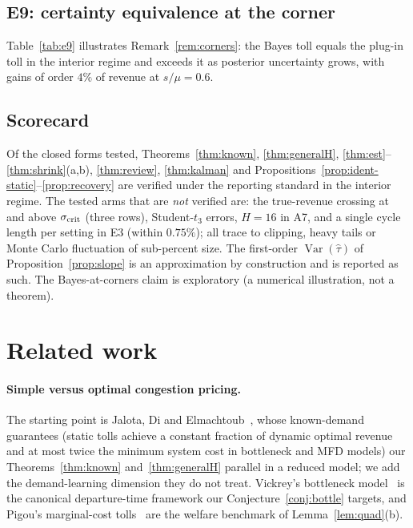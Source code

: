 \documentclass[11pt]{article}
\theoremstyle{definition}
\theoremstyle{remark}
\newcommand{\Var}{\operatorname{Var}}
\begin{document}
\begin{expsec}
\subsection{E9: certainty equivalence at the corner}
\begin{table}[t]\centering\small
\caption{E9. Bayes-optimal versus plug-in single-period toll under posterior $\alpha\sim N(\mu,s^2)$, $\mu=10$, $\beta=1$, true clipped revenue. Rows with $s/\mu>0.6$ are omitted because the Gaussian posterior then places non-negligible mass on negative demand.}\label{tab:e9}\end{table}
Table~\ref{tab:e9} illustrates Remark~\ref{rem:corners}: the Bayes toll equals the plug-in toll in the interior regime and exceeds it as posterior uncertainty grows, with gains of order $4\%$ of revenue at $s/\mu=0.6$.

\subsection{Scorecard}
Of the closed forms tested, Theorems~\ref{thm:known}, \ref{thm:generalH}, \ref{thm:est}--\ref{thm:shrink}(a,b), \ref{thm:review}, \ref{thm:kalman} and Propositions~\ref{prop:ident-static}--\ref{prop:recovery} are verified under the reporting standard in the interior regime. The tested arms that are \emph{not} verified are: the true-revenue crossing at and above $\sigma_{\rm crit}$ (three rows), Student-$t_3$ errors, $H=16$ in A7, and a single cycle length per setting in E3 (within $0.75\%$); all trace to clipping, heavy tails or Monte Carlo fluctuation of sub-percent size. The first-order $\Var(\hat\tau)$ of Proposition~\ref{prop:slope} is an approximation by construction and is reported as such. The Bayes-at-corners claim is exploratory (a numerical illustration, not a theorem).

\end{expsec}

\section{Related work}\label{sec:related}
\paragraph{Simple versus optimal congestion pricing.} The starting point is Jalota, Di and Elmachtoub~\cite{jde2026}, whose known-demand guarantees (static tolls achieve a constant fraction of dynamic optimal revenue and at most twice the minimum system cost in bottleneck and MFD models) our Theorems~\ref{thm:known} and~\ref{thm:generalH} parallel in a reduced model; we add the demand-learning dimension they do not treat. Vickrey's bottleneck model~\cite{vickrey1969} is the canonical departure-time framework our Conjecture~\ref{conj:bottle} targets, and Pigou's marginal-cost tolls~\cite{pigou1920} are the welfare benchmark of Lemma~\ref{lem:quad}(b).
\end{document}
